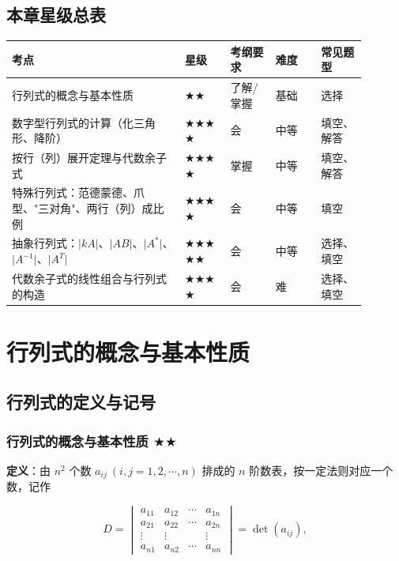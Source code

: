 \documentclass[11pt,openany,UTF8]{ctexbook}
\begin{document}
\subsection*{本章星级总表}

\begingroup\small\setlength{\tabcolsep}{4.0pt}
\begin{longtable}{@{}L{0.4240\linewidth}L{0.1175\linewidth}L{0.1175\linewidth}L{0.1175\linewidth}L{0.1175\linewidth}@{}}
\toprule
\textbf{考点} & \textbf{星级} & \textbf{考纲要求} & \textbf{难度} & \textbf{常见题型} \\
\midrule
\endhead
行列式的概念与基本性质 & $\bigstar$$\bigstar$ & 了解/掌握 & 基础 & 选择 \\
数字型行列式的计算（化三角形、降阶） & $\bigstar$$\bigstar$$\bigstar$$\bigstar$ & 会 & 中等 & 填空、解答 \\
按行（列）展开定理与代数余子式 & $\bigstar$$\bigstar$$\bigstar$$\bigstar$ & 掌握 & 中等 & 填空、解答 \\
特殊行列式：范德蒙德、爪型、"三对角"、两行（列）成比例 & $\bigstar$$\bigstar$$\bigstar$$\bigstar$ & 会 & 中等 & 填空 \\
抽象行列式：$\vert kA\vert$、$\vert AB\vert$、$\vert A^*\vert$、$\vert A^{-1}\vert$、$\vert A^T\vert$ & $\bigstar$$\bigstar$$\bigstar$$\bigstar$$\bigstar$ & 会 & 中等 & 选择、填空 \\
代数余子式的线性组合与行列式的构造 & $\bigstar$$\bigstar$$\bigstar$$\bigstar$ & 会 & 难 & 选择、填空 \\
\bottomrule
\end{longtable}
\endgroup

\section{行列式的概念与基本性质}

\subsection{行列式的定义与记号}

\subsubsection{行列式的概念与基本性质 $\bigstar$$\bigstar$}

\textbf{定义}：由 $n^2$ 个数 $a_{ij}\ (i,j=1,2,\cdots,n)$ 排成的 $n$ 阶数表，按一定法则对应一个数，记作

\[D=\begin{vmatrix}a_{11}&a_{12}&\cdots&a_{1n}\\a_{21}&a_{22}&\cdots&a_{2n}\\\vdots&\vdots&&\vdots\\a_{n1}&a_{n2}&\cdots&a_{nn}\end{vmatrix}=\det(a_{ij}),\]
\end{document}
